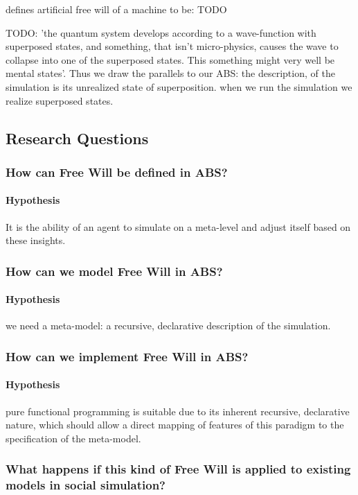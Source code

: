 \cite{irtem_simulation_1978} defines artificial free will of a machine to be: TODO

TODO: 'the quantum system develops according to a wave-function with superposed states, and something, that isn't micro-physics, causes the wave to collapse into one of the superposed states. This something might very well be mental states'. Thus we draw the parallels to our ABS: the description, of the simulation is its unrealized state of superposition. when we run the simulation we realize superposed states. 

\subsection{Research Questions}

\subsubsection{How can Free Will be defined in ABS?}
\paragraph{Hypothesis} It is the ability of an agent to simulate on a meta-level and adjust itself based on these insights.

\subsubsection{How can we model Free Will in ABS?}
\paragraph{Hypothesis} we need a meta-model: a recursive, declarative description of the simulation.

\subsubsection{How can we implement Free Will in ABS?}
\paragraph{Hypothesis} pure functional programming is suitable due to its inherent recursive, declarative nature, which should allow a direct mapping of features of this paradigm to the specification of the meta-model.

\subsubsection{What happens if this kind of Free Will is applied to existing models in social simulation?}

